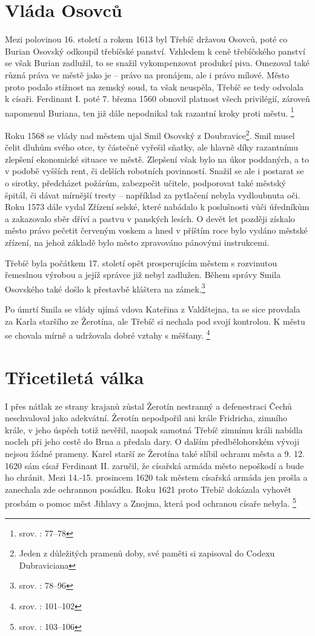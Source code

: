 \documentclass[a4paper,oneside,12p]{report}
\begin{document}
\section{Vláda Osovců}

Mezi polovinou 16. století a rokem 1613 byl Třebíč državou Osovců, poté co Burian Osovský odkoupil třebíčské panství.
Vzhledem k ceně třebíčského panství se však Burian zadlužil, to se snažil vykompenzovat produkcí piva.
Omezoval také různá práva ve městě jako je -- právo na pronájem, ale i právo mílové.
Město proto podalo stížnost na zemský soud, ta však neuspěla, Třebíč se tedy odvolala k císaři.
Ferdinant I. poté 7. března 1560 obnovil platnost všech privilégií, zároveň napomenul Buriana, ten již dále nepodnikal tak razantní kroky proti městu. \footnote{srov. \cite{Uhlir1978}: 77--78}

Roku 1568 se vlády nad městem ujal Smil Osovský z Doubravice\footnote{Jeden z důležitých pramenů doby, své paměti si zapisoval do Codexu Dubraviciana}.
Smil musel čelit dluhům svého otce, ty částečně vyřešil sňatky, ale hlavně díky razantnímu zlepšení ekonomické situace ve městě.
Zlepšení však bylo na úkor poddaných, a to v podobě vyšších rent, či delších robotních povinností.
Snažil se ale i postarat se o sirotky, předcházet požárům, zabezpečit učitele, podporovat také městský špitál, či dávat mírnější tresty -- například za pytlačení nebyla vydloubnuta oči.
Roku 1573 dále vydal Zřízení selské, které nabádalo k poslušnosti vůči úředníkům a zakazovalo sběr dříví a pastvu v panských lesích.
O devět let později získalo město právo pečetit červeným voskem a hned v příštím roce bylo vydáno městské zřízení, na jehož základě bylo město zpravováno pánovými instrukcemi.

Třebíč byla počátkem 17. století opět prosperujícím městem s rozvinutou řemeslnou výrobou a jejíž správce již nebyl zadlužen.
Během správy Smila Osovského také došlo k přestavbě kláštera na zámek.\footnote{srov. \cite{Uhlir1978}: 78--96}

Po úmrtí Smila se vlády ujímá vdova Kateřina z Valdštejna, ta se sice provdala za Karla staršího ze Žerotína, ale Třebíč si nechala pod svojí kontrolou.
K městu se chovala mírně a udržovala dobré vztahy s měšťany. \footnote{srov. \cite{Uhlir1978}: 101--102}


\section{Třicetiletá válka}

I přes nátlak ze strany krajanů zůstal Žerotín nestranný a defenestraci Čechů neschvaloval jako adekvátní.
Žerotín nepodpořil ani krále Fridricha, zimního krále, v jeho úspěch totiž nevěřil, naopak samotná Třebíč zimnímu králi nabídla nocleh při jeho cestě do Brna a předala dary.
O dalším předbělohorském vývoji nejsou žádné prameny.
Karel starší ze Žerotína také slíbil ochranu města a 9. 12. 1620 sám císař Ferdinant II. zaručil, že císařská armáda město nepoškodí a bude ho chránit.
Mezi 14.-15. prosincem 1620 tak městem císařská armáda jen prošla a zanechala zde ochrannou posádku.
Roku 1621 proto Třebíč dokázala vyhovět prosbám o pomoc měst Jihlavy a Znojma, která pod ochranou císaře nebyla. \footnote{srov. \cite{Uhlir1978}: 103--106}
\end{document}

